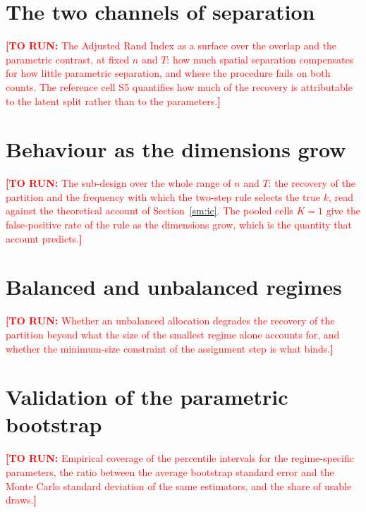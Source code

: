 \documentclass[11pt]{article}
\newcommand{\TODO}[1]{\textcolor{red}{\textbf{[TO RUN:} #1\textbf{]}}}
\begin{document}
\section{The two channels of separation}\label{sm:channels}
\TODO{The Adjusted Rand Index as a surface over the overlap and the parametric contrast, at fixed $n$ and $T$: how much spatial separation compensates for how little parametric separation, and where the procedure fails on both counts. The reference cell S5 quantifies how much of the recovery is attributable to the latent split rather than to the parameters.}

\section{Behaviour as the dimensions grow}\label{sm:dims}
\TODO{The sub-design over the whole range of $n$ and $T$: the recovery of the partition and the frequency with which the two-step rule selects the true $k$, read against the theoretical account of Section~\ref{sm:ic}. The pooled cells $K = 1$ give the false-positive rate of the rule as the dimensions grow, which is the quantity that account predicts.}

\section{Balanced and unbalanced regimes}\label{sm:balance}
\TODO{Whether an unbalanced allocation degrades the recovery of the partition beyond what the size of the smallest regime alone accounts for, and whether the minimum-size constraint of the assignment step is what binds.}

\section{Validation of the parametric bootstrap}\label{sm:boot}
\TODO{Empirical coverage of the percentile intervals for the regime-specific parameters, the ratio between the average bootstrap standard error and the Monte Carlo standard deviation of the same estimators, and the share of usable draws.}
\end{document}
